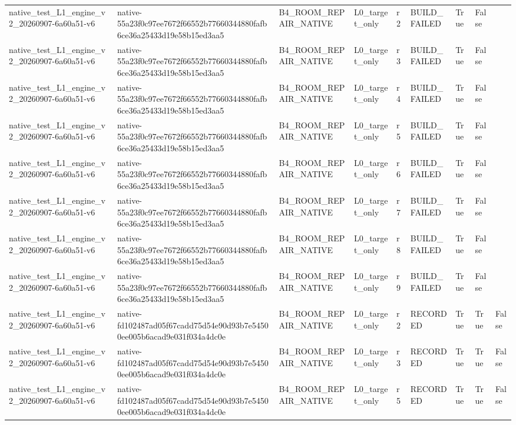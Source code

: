 \begin{tabular}{lllllllll}
native\_test\_L1\_engine\_v2\_20260907-6a60a51-v6 & native-55a23f0c97ee7672f66552b77660344880fafb6ce36a25433d19e58b15ed3aa5 & B4\_ROOM\_REPAIR\_NATIVE & L0\_target\_only & r2 & BUILD\_FAILED & True & False &  \\
native\_test\_L1\_engine\_v2\_20260907-6a60a51-v6 & native-55a23f0c97ee7672f66552b77660344880fafb6ce36a25433d19e58b15ed3aa5 & B4\_ROOM\_REPAIR\_NATIVE & L0\_target\_only & r3 & BUILD\_FAILED & True & False &  \\
native\_test\_L1\_engine\_v2\_20260907-6a60a51-v6 & native-55a23f0c97ee7672f66552b77660344880fafb6ce36a25433d19e58b15ed3aa5 & B4\_ROOM\_REPAIR\_NATIVE & L0\_target\_only & r4 & BUILD\_FAILED & True & False &  \\
native\_test\_L1\_engine\_v2\_20260907-6a60a51-v6 & native-55a23f0c97ee7672f66552b77660344880fafb6ce36a25433d19e58b15ed3aa5 & B4\_ROOM\_REPAIR\_NATIVE & L0\_target\_only & r5 & BUILD\_FAILED & True & False &  \\
native\_test\_L1\_engine\_v2\_20260907-6a60a51-v6 & native-55a23f0c97ee7672f66552b77660344880fafb6ce36a25433d19e58b15ed3aa5 & B4\_ROOM\_REPAIR\_NATIVE & L0\_target\_only & r6 & BUILD\_FAILED & True & False &  \\
native\_test\_L1\_engine\_v2\_20260907-6a60a51-v6 & native-55a23f0c97ee7672f66552b77660344880fafb6ce36a25433d19e58b15ed3aa5 & B4\_ROOM\_REPAIR\_NATIVE & L0\_target\_only & r7 & BUILD\_FAILED & True & False &  \\
native\_test\_L1\_engine\_v2\_20260907-6a60a51-v6 & native-55a23f0c97ee7672f66552b77660344880fafb6ce36a25433d19e58b15ed3aa5 & B4\_ROOM\_REPAIR\_NATIVE & L0\_target\_only & r8 & BUILD\_FAILED & True & False &  \\
native\_test\_L1\_engine\_v2\_20260907-6a60a51-v6 & native-55a23f0c97ee7672f66552b77660344880fafb6ce36a25433d19e58b15ed3aa5 & B4\_ROOM\_REPAIR\_NATIVE & L0\_target\_only & r9 & BUILD\_FAILED & True & False &  \\
native\_test\_L1\_engine\_v2\_20260907-6a60a51-v6 & native-fd102487ad05f67cadd75d54e90d93b7e54500ee005b6acad9e031f034a4dc0e & B4\_ROOM\_REPAIR\_NATIVE & L0\_target\_only & r2 & RECORDED & True & True & False \\
native\_test\_L1\_engine\_v2\_20260907-6a60a51-v6 & native-fd102487ad05f67cadd75d54e90d93b7e54500ee005b6acad9e031f034a4dc0e & B4\_ROOM\_REPAIR\_NATIVE & L0\_target\_only & r3 & RECORDED & True & True & False \\
native\_test\_L1\_engine\_v2\_20260907-6a60a51-v6 & native-fd102487ad05f67cadd75d54e90d93b7e54500ee005b6acad9e031f034a4dc0e & B4\_ROOM\_REPAIR\_NATIVE & L0\_target\_only & r5 & RECORDED & True & True & False \\

\end{tabular}
